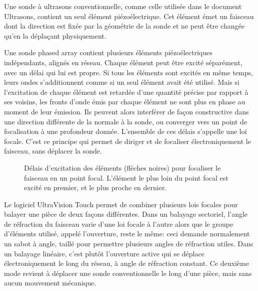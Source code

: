 \documentclass[11pt,letterpaper]{article}
\begin{document}
Une sonde \`a ultrasons conventionnelle, comme celle utilis\'ee dans le document Ultrasons, contient un seul \'el\'ement pi\'ezo\'electrique. Cet \'el\'ement \'emet un faisceau dont la direction est fix\'ee par la g\'eom\'etrie de la sonde et ne peut \^etre chang\'ee qu'en la d\'epla\c cant physiquement.

Une sonde phased array contient plusieurs \'el\'ements pi\'ezo\'electriques ind\'ependants, align\'es en r\'eseau. Chaque \'el\'ement peut \^etre excit\'e s\'epar\'ement, avec un d\'elai qui lui est propre. Si tous les \'el\'ements sont excit\'es en m\^eme temps, leurs ondes s'additionnent comme si un seul \'el\'ement avait \'et\'e utilis\'e. Mais si l'excitation de chaque \'el\'ement est retard\'ee d'une quantit\'e pr\'ecise par rapport \`a ses voisins, les fronts d'onde \'emis par chaque \'el\'ement ne sont plus en phase au moment de leur \'emission. Ils peuvent alors interf\'erer de fa\c con constructive dans une direction diff\'erente de la normale \`a la sonde, ou converger vers un point de focalisation \`a une profondeur donn\'ee. L'ensemble de ces d\'elais s'appelle une loi focale. C'est ce principe qui permet de diriger et de focaliser \'electroniquement le faisceau, sans d\'eplacer la sonde.

\begin{figure}[H]
\centering
{}
\caption{D\'elais d'excitation des \'el\'ements (fl\`eches noires) pour focaliser le faisceau en un point focal. L'\'el\'ement le plus loin du point focal est excit\'e en premier, et le plus proche en dernier.}
\label{fig:loi-focale}
\end{figure}

Le logiciel UltraVision Touch permet de combiner plusieurs lois focales pour balayer une pi\`ece de deux fa\c cons diff\'erentes. Dans un balayage sectoriel, l'angle de r\'efraction du faisceau varie d'une loi focale \`a l'autre alors que le groupe d'\'el\'ements utilis\'e, appel\'e l'ouverture, reste le m\^eme: ceci demande normalement un sabot \`a angle, taill\'e pour permettre plusieurs angles de r\'efraction utiles. Dans un balayage lin\'eaire, c'est plut\^ot l'ouverture active qui se d\'eplace \'electroniquement le long du r\'eseau, \`a angle de r\'efraction constant. Ce deuxi\`eme mode revient \`a d\'eplacer une sonde conventionnelle le long d'une pi\`ece, mais sans aucun mouvement m\'ecanique.
\end{document}
